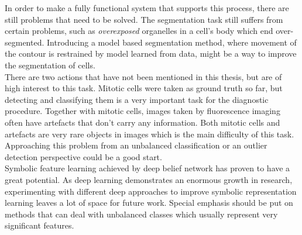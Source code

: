 In order to make a fully functional system that supports this process, there are still problems that need to be solved. The segmentation task still suffers from certain problems, such as \textit{overexposed} organelles in a cell's body which end over-segmented. Introducing a model based segmentation method, where movement of the contour is restrained by model learned from data, might be a way to improve the segmentation of cells. \\

There are two actions that have not been mentioned in this thesis, but are of high interest to this task. Mitotic cells were taken as ground truth so far, but detecting and classifying them is a very important task for the diagnostic procedure. Together with mitotic cells, images taken by fluorescence imaging often have artefacts that don't carry any information. Both mitotic cells and artefacts are very rare objects in images which is the main difficulty of this task. Approaching this problem from an unbalanced classification or an outlier detection perspective could be a good start. \\

Symbolic feature learning achieved by deep belief network has proven to have a great potential. As deep learning demonstrates an enormous growth in research, experimenting with different deep approaches to improve symbolic representation learning leaves a lot of space for future work. Special emphasis should be put on methods that can deal with unbalanced classes which usually represent very significant features.